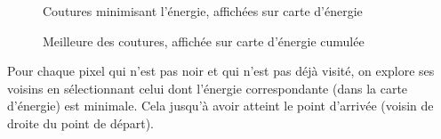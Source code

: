 \documentclass[a4paper]{article}
\begin{document}
\begin{figure}[!ht]%
    \centering
    \hspace{0.030\textwidth}
    \caption{Coutures minimisant l'énergie, affichées sur carte d'énergie}
    \label{allseams}
\end{figure}

\begin{figure}[!ht]%
    \centering
    \hspace{0.030\textwidth}
    \caption{Meilleure des coutures, affichée sur carte d'énergie cumulée}
    \label{bestseam}
\end{figure}
Pour chaque pixel qui n’est pas noir et qui n’est pas déjà visité, on explore ses voisins en sélectionnant celui dont l’énergie correspondante (dans la carte d’énergie) est minimale. Cela jusqu'à avoir atteint le point d'arrivée (voisin de droite du point de départ).
\end{document}
